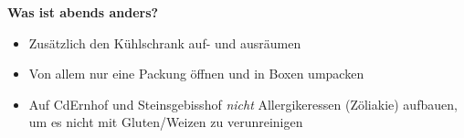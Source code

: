 \documentclass[showtrims, a4paper]{article}
\begin{document}
\vspace{0.0cm}
\begin{center}
\textbf{Was ist abends anders?}
\begin{itemize}
 \item Zusätzlich den Kühlschrank auf- und ausräumen
 \item Von allem nur eine Packung öffnen und in Boxen umpacken
 \item Auf CdErnhof und Steinsgebisshof \emph{nicht} Allergikeressen (Zöliakie) aufbauen, um es nicht mit Gluten/Weizen zu verunreinigen
\end{itemize}
\end{center}
\end{document}
